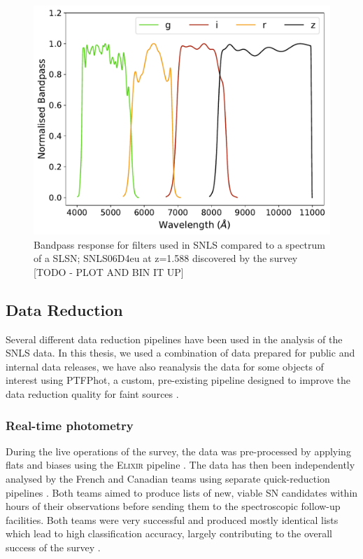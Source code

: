 \begin{figure}
  \centering
  \includegraphics[scale=0.8]{Figures/Chapter2/SNLS_filters.pdf}
	\caption{Bandpass response for filters used in SNLS compared to a spectrum of a SLSN; SNLS06D4eu at z=1.588 discovered by the survey [TODO - PLOT AND BIN IT UP]}
    \label{fig:SNLSFilters}
\end{figure}

\subsection{Data Reduction}
Several different data reduction pipelines have been used in the analysis of the SNLS data. In this thesis, we used a combination of data prepared for public and internal data releases, we have also reanalysis the data for some objects of interest using PTFPhot, a custom, pre-existing pipeline designed to improve the data reduction quality for faint sources \citep{Firth2015}.

\subsubsection{Real-time photometry}
During the live operations of the survey, the data was pre-processed by applying flats and biases using the \textsc{Elixir} pipeline \citep{Magnier2004}. The data has then been independently analysed by the French and Canadian teams using separate quick-reduction pipelines \citep{Astier2006,Bazin2011}. Both teams aimed to produce lists of new, viable SN candidates within hours of their observations before sending them to the spectroscopic follow-up facilities. Both teams were very successful and produced mostly identical lists which lead to high classification accuracy, largely contributing to the overall success of the survey \citep{Pritchet2004}.

